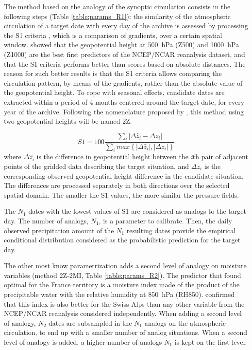 \documentclass[review]{elsarticle}
\begin{document}
The method based on the analogy of the synoptic circulation consists in the following steps (Table \ref{table:params_R1}): the similarity of the atmospheric circulation of a target date with every day of the archive is assessed by processing the S1 criteria \citep[Eq.\ \ref{eq:S1}, ][]{Teweles1954, Drosdowsky2003}, which is a comparison of gradients, over a certain spatial window. \citet{Bontron2005} showed that the geopotential height at 500~hPa (Z500) and 1000~hPa (Z1000) are the best first predictors of the NCEP/NCAR reanalysis dataset, and that the S1 criteria performs better than scores based on absolute distances. The reason for such better results is that the S1 criteria allows comparing the circulation pattern, by means of the gradients, rather than the absolute value of the geopotential height. To cope with seasonal effects, candidate dates are extracted within a period of 4 months centered around the target date, for every year of the archive. Following the nomenclature proposed by \citet{Horton2016}, this method using two geopotential heights will be named 2Z.

\begin{equation}
\label{eq:S1}
S1=100 \frac {\displaystyle \sum_{i} \vert \Delta\hat{z}_{i} - \Delta z_{i} \vert}
{\displaystyle \sum_{i} max\left\lbrace \vert \Delta\hat{z}_{i} \vert , \vert \Delta z_{i} \vert \right\rbrace }
\end{equation}
where $\Delta \hat{z}_{i}$ is the difference in geopotential height between the \textit{i}th pair of adjacent points of the gridded data describing the target situation, and $\Delta z_{i}$ is the corresponding observed geopotential height difference in the candidate situation. The differences are processed separately in both directions over the selected spatial domain. The smaller the S1 values, the more similar the pressure fields.

The $N_{1}$ dates with the lowest values of S1 are considered as analogs to the target day. The number of analogs, $N_{1}$, is a parameter to calibrate. Then, the daily observed precipitation amount of the $N_{1}$ resulting dates provide the empirical conditional distribution considered as the probabilistic prediction for the target day.

The other most know parametrization adds a second level of analogy on moisture variables (method 2Z-2MI, Table \ref{table:params_R2}). The predictor that \citet{Bontron2004} found optimal for the France territory is a moisture index made of the product of the precipitable water with the relative humidity at 850~hPa (RH850). \cite{Horton2012a} confirmed that this index is also better for the Swiss Alps than any other variable from the NCEP/NCAR reanalysis considered independently. When adding a second level of analogy, $N_{2}$ dates are subsampled in the $N_{1}$ analogs on the atmospheric circulation, to end up with a smaller number of analog situations. When a second level of analogy is added, a higher number of analogs $N_{1}$ is kept on the first level.
\end{document}
